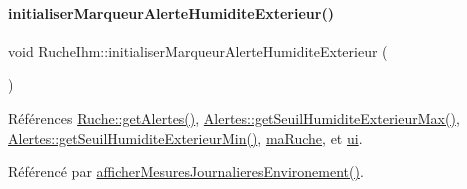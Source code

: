 \paragraph{\texorpdfstring{initialiser\+Marqueur\+Alerte\+Humidite\+Exterieur()}{initialiserMarqueurAlerteHumiditeExterieur()}}
{\footnotesize\ttfamily void Ruche\+Ihm\+::initialiser\+Marqueur\+Alerte\+Humidite\+Exterieur (\begin{DoxyParamCaption}{ }\end{DoxyParamCaption})\hspace{0.3cm}{\ttfamily [private]}}



Références \hyperlink{class_ruche_a9edbc2e81ccb2cb76de43639bcb16ec1}{Ruche\+::get\+Alertes()}, \hyperlink{class_alertes_ad2c8daf5668f5d122efb9b84f7ea86de}{Alertes\+::get\+Seuil\+Humidite\+Exterieur\+Max()}, \hyperlink{class_alertes_a68e467e042b615f56347a0953d6e64f1}{Alertes\+::get\+Seuil\+Humidite\+Exterieur\+Min()}, \hyperlink{class_ruche_ihm_a43a6b1fa31f4fba58d919daae3707b38}{ma\+Ruche}, et \hyperlink{class_ruche_ihm_a64786058bd7f88ca2f1e9743bb27c25b}{ui}.



Référencé par \hyperlink{class_ruche_ihm_a5ee5942435915ca134765f42ff4b9061}{afficher\+Mesures\+Journalieres\+Environement()}.


